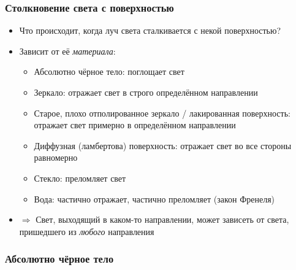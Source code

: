 \documentclass{beamer}
\begin{document}
\begin{frame}[fragile]
\frametitle{Столкновение света с поверхностью}
\begin{itemize}
\item Что происходит, когда луч света сталкивается с некой поверхностью?
\pause
\item Зависит от её \textit{материала}:
\pause
\begin{itemize}
\item Абсолютно чёрное тело: поглощает свет
\pause
\item Зеркало: отражает свет в строго определённом направлении
\pause
\item Старое, плохо отполированное зеркало / лакированная поверхность: отражает свет примерно в определённом направлении
\pause
\item Диффузная (ламбертова) поверхность: отражает свет во все стороны равномерно
\pause
\item Стекло: преломляет свет
\pause
\item Вода: частично отражает, частично преломляет (закон Френеля)
\end{itemize}
\pause
\item \begin{math}\Rightarrow\end{math} Свет, выходящий в каком-то направлении, может зависеть от света, пришедшего из \textit{любого} направления
\end{itemize}
\end{frame}

\begin{frame}[fragile]
\frametitle{Абсолютно чёрное тело}
\begin{center}
\end{center}
\end{frame}
\end{document}
